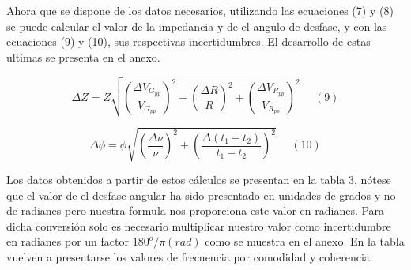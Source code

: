 \documentclass[article, 11pt]{report}
\begin{document}
Ahora que se dispone de los datos necesarios, utilizando las ecuaciones (7) y (8) se puede calcular el valor de la impedancia y de el angulo de desfase, y con las ecuaciones (9) y (10), sus respectivas incertidumbres. El desarrollo de estas ultimas se presenta en el anexo.

$$ \Delta Z = Z\sqrt{(\dfrac{\Delta V_G_{pp}}{V_G_{pp}})^2 + (\dfrac{\Delta R}{R})^2 + (\dfrac{\Delta V_R_{pp}}{V_R_{pp}})^2} ~~~~~~ (9)$$

$$ \Delta \phi = \phi\sqrt{(\dfrac{\Delta \nu}{\nu})^2 + (\dfrac{\Delta (t_1-t_2)}{t_1-t_2})^2} ~~~~~~ (10)$$

Los datos obtenidos a partir de estos cálculos se presentan en la tabla 3, nótese que el valor de el desfase angular ha sido presentado en unidades de grados y no de radianes pero nuestra formula nos proporciona este valor en radianes. Para dicha conversión solo es necesario multiplicar nuestro valor como incertidumbre en radianes por un factor $180^o/ \pi(rad)$ como se muestra en el anexo. En la tabla vuelven a presentarse los valores de frecuencia por comodidad y coherencia.
\end{document}
